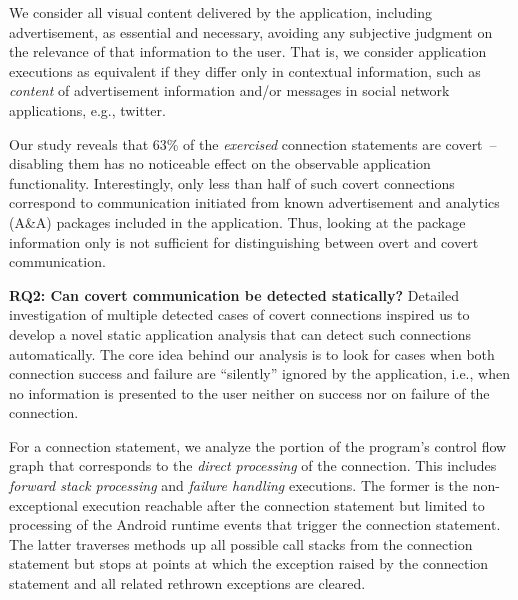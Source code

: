 We consider all visual content delivered by the application, including advertisement, as essential and necessary, avoiding any subjective judgment on the relevance of that information to the user.  
That is, we consider application executions as
equivalent if they %
differ only in contextual information, such as   
\emph{content} of advertisement information and/or messages in social network
applications, e.g., twitter.

Our study reveals that 63\% of
the \emph{exercised} connection statements are covert~-- disabling
them has no noticeable effect on the observable application
functionality. Interestingly, only less than half of such covert connections correspond to communication initiated from known advertisement and analytics (A\&A) packages included in the application.
Thus, looking at the package information only is not sufficient for distinguishing between
overt and covert communication. 

\noindent 
{\bf RQ2: Can covert communication be detected statically?}
Detailed investigation of multiple detected cases of covert
connections inspired us to develop a novel static application analysis that
can detect such connections automatically.  The core idea behind our
analysis is to look for cases when both connection success and failure are ``silently'' ignored by the application, i.e., when no information is presented to the user neither on success nor on   failure of the connection. 

For a connection statement, we analyze the portion of the program's
control flow graph that corresponds to the \emph{direct processing} of
the connection.  This includes
\emph{forward stack processing} and \emph{failure handling}
executions.  The former is the non-exceptional execution reachable
after the connection statement but limited to processing of the
Android runtime events that trigger the connection statement.
The latter traverses methods up all possible call stacks from the
connection statement but stops at points at which the
exception raised by the connection statement and all related rethrown
exceptions are cleared.

